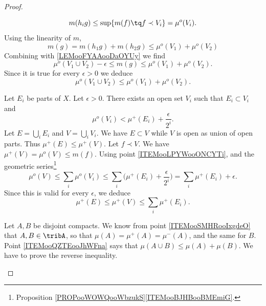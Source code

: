 \begin{proof}
\begin{subproof}
\begin{equation}
			m(h_ig)\leq \sup\{ m(f)\tq f\prec V_i \}=\mu^o(V_i).
		\end{equation}
		Using the linearity of \( m\),
		\begin{equation}
			m(g)=m(h_1g)+m(h_2g)\leq \mu^o(V_1)+\mu^o(V_2)
		\end{equation}
		Combining with \eqref{LEMooFYAAooDaOYUy} we find
		\begin{equation}
			\mu^o(V_1\cup V_2)-\epsilon\leq m(g)\leq \mu^o(V_1)+\mu^o(V_2).
		\end{equation}
		Since it is true for every \( \epsilon>0\) we deduce
		\begin{equation}
			\mu^o(V_1\cup V_2)\leq \mu^o(V_1)+\mu^o(V_2).
		\end{equation}

		       \label{ITEMooQZTEooJhWFna}

		Let \( E_i\) be parts of \( X\). Let \( \epsilon>0\). There exists an open set \( V_i\) such that \( E_i\subset V_i\) and
		\begin{equation}
			\mu^o(V_i)<\mu^+(E_i)+\frac{ \epsilon }{ 2^i }.
		\end{equation}
		Let \( E=\bigcup_iE_i\) and \( V=\bigcup_iV_i\). We have \( E\subset V\) while \( V\) is open as union of open parts. Thus \( \mu^+(E)\leq \mu^+(V)\). Let \( f\prec V\). We have \( \mu^+(V)=\mu^o(V)\leq m(f)\). Using point \ref{ITEMooLPYWooONCYTi}, and the geometric series\footnote{Proposition \ref{PROPooWOWQooWbzukS}\ref{ITEMooBJHBooBMEmiG}.}
		\begin{equation}
			\mu^o(V)\leq \sum_i\mu^o(V_i)\leq \sum_i\big( \mu^+(E_i)+\frac{ \epsilon }{ 2^i } \big)=\sum_i\mu^+(E_i)+\epsilon.
		\end{equation}
		Since this is valid for every \( \epsilon\), we deduce
		\begin{equation}
			\mu^+(E)\leq \mu^+(V)\leq \sum_i\mu^+(E_i).
		\end{equation}

		\spitem[\( \mu^+(A\cup B)=\mu^+(A)+\mu^+(B)\) when \( A,B\) are disjoint compacts] \label{ITEMooCVWSooCmPoPL}

		Let \( A,B\) be disjoint compacts. We know from point \ref{ITEMooSMHRooIxgdeO} that \( A,B\in \tribA\), so that \( \mu(A)=\mu^+(A)=\mu^-(A)\), and the same for \( B\). Point \ref{ITEMooQZTEooJhWFna} says that \( \mu(A\cup B)\leq \mu(A)+\mu(B)\). We have to prove the reverse inequality.


\end{subproof}
\end{proof}
